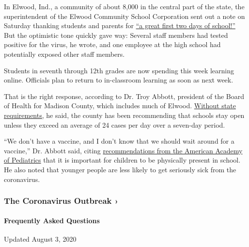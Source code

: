In Elwood, Ind., a community of about 8,000 in the central part of the
state, the superintendent of the Elwood Community School Corporation
sent out a note on Saturday thanking students and parents for
\href{https://www.facebookcorewwwi.onion/ElwoodCommunitySchools/photos/pcb.1875944365880857/1875944205880873/?type=3\&theater}{``a
great first two days of school!''} But the optimistic tone quickly gave
way: Several staff members had tested positive for the virus, he wrote,
and one employee at the high school had potentially exposed other staff
members.

Students in seventh through 12th grades are now spending this week
learning online. Officials plan to return to in-classroom learning as
soon as next week.

That is the right response, according to Dr. Troy Abbott, president of
the Board of Health for Madison County, which includes much of Elwood.
\href{https://www.indystar.com/story/news/education/2020/08/02/indiana-schools-reopening-how-we-know-districts-safe/5558849002/}{Without
state requirements,} he said, the county has been recommending that
schools stay open unless they exceed an average of 24 cases per day over
a seven-day period.

``We don't have a vaccine, and I don't know that we should wait around
for a vaccine,'' Dr. Abbott said, citing
\href{https://www.nytimes3xbfgragh.onion/2020/06/30/us/coronavirus-schools-reopening-guidelines-aap.html}{recommendations
from the American Academy of Pediatrics} that it is important for
children to be physically present in school. He also noted that younger
people are less likely to get seriously sick from the coronavirus.

\href{https://www.nytimes3xbfgragh.onion/news-event/coronavirus?action=click\&pgtype=Article\&state=default\&region=MAIN_CONTENT_3\&context=storylines_faq}{}

\hypertarget{the-coronavirus-outbreak-}{%
\subsubsection{The Coronavirus Outbreak
›}\label{the-coronavirus-outbreak-}}

\hypertarget{frequently-asked-questions}{%
\paragraph{Frequently Asked
Questions}\label{frequently-asked-questions}}

Updated August 3, 2020

